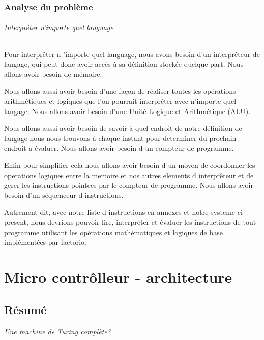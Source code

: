 \documentclass{scrreprt}
\begin{document}
	
	
	
	\section{Analyse du problème}
	
	
	
	
	\paragraph{Interprêter n'importe quel language}
	Pour interprêter n 'importe quel language, nous avons besoin d'un interpréteur de langage, qui peut donc avoir accès à sa définition stockée quelque part. Nous allons avoir besoin de mémoire. 
	
	Nous allons aussi avoir besoin d'une façon de réaliser toutes les opérations arithmétiques et logiques que l'on pourrait interprêter avec n'importe quel langage. Nous allons avoir besoin d'une Unité Logique et Arithmétique (ALU).
	
	Nous allons aussi avoir besoin de savoir à quel endroit de notre définition de langage nous nous trouvons à chaque instant pour determiner du prochain endroit a évaluer. Nous allons avoir besoin d un compteur de programme.
	
	Enfin pour simplifier cela nous allons avoir besoin d un moyen de coordonner les operations logiques entre la memoire et nos autres elements d interprêteur et de gerer les instructions pointees par le compteur de programme. Nous allons avoir besoin d'un séquenceur d instructions.
	
	Autrement dit, avec notre liste d instructions en annexes et notre systeme ci present, nous devrions pouvoir lire, interpréter et évaluer les instructions de tout programme utilisant les opérations mathématiques et logiques de base implémentées par factorio. 
	
	\part{Micro contrôlleur - architecture}
	\chapter{Résumé}
	
	\paragraph{Une machine de Turing complète?}
	
\end{document}
